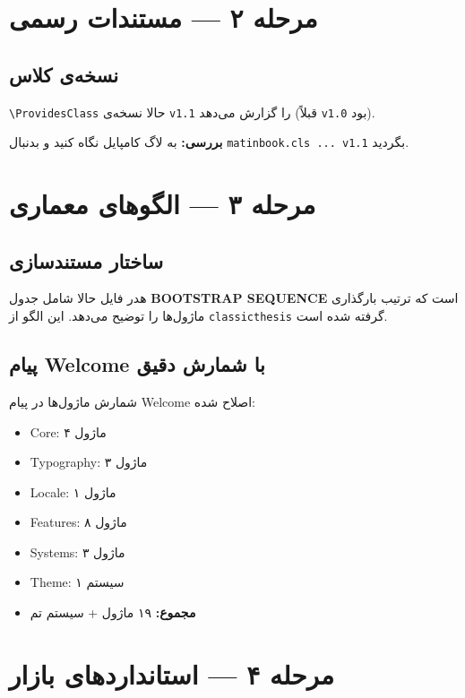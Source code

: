 \documentclass{matinbook}
\begin{document}
\section{مرحله ۲ — مستندات رسمی}
\label{sec:stage2}

\subsection{نسخه‌ی کلاس}

\verb|\ProvidesClass| حالا نسخه‌ی \verb|v1.1| را گزارش می‌دهد
(قبلاً \verb|v1.0| بود).

\textbf{بررسی:} به لاگ کامپایل نگاه کنید و بدنبال
\verb|matinbook.cls ... v1.1| بگردید.

\section{مرحله ۳ — الگوهای معماری}
\label{sec:stage3}

\subsection{ساختار مستندسازی}

هدر فایل حالا شامل جدول \textbf{BOOTSTRAP SEQUENCE} است که ترتیب
بارگذاری ماژول‌ها را توضیح می‌دهد. این الگو از \verb|classicthesis|
گرفته شده است.

\subsection{پیام Welcome با شمارش دقیق}

شمارش ماژول‌ها در پیام Welcome اصلاح شده:

\begin{itemize}
    \item Core: ۴ ماژول
    \item Typography: ۳ ماژول
    \item Locale: ۱ ماژول
    \item Features: ۸ ماژول
    \item Systems: ۳ ماژول
    \item Theme: ۱ سیستم
    \item \textbf{مجموع:} ۱۹ ماژول + سیستم تم
\end{itemize}

\section{مرحله ۴ — استانداردهای بازار}
\label{sec:stage4}
\end{document}
